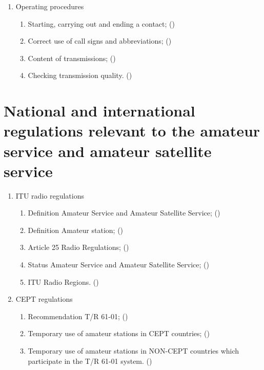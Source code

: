 \begin{flushleft}
\begin{enumerate}
\begin{enumerate}
\item Operating procedures
\begin{enumerate}
\item Starting, carrying out and ending a contact;
  ()\label{HAREC.b.7.2.1}
\item Correct use of call signs and abbreviations;
  ()\label{HAREC.b.7.2.2}
\item Content of transmissions;
  ()\label{HAREC.b.7.2.3}
\item Checking transmission quality.
  ()\label{HAREC.b.7.2.4}
\end{enumerate}
\end{enumerate}

\end{enumerate}

\newpage

\section[Regulations]{National and international regulations relevant to the amateur service and amateur satellite service}

\begin{enumerate}

\item ITU radio regulations
\begin{enumerate}
\item Definition Amateur Service and Amateur Satellite Service;
  ()\label{HAREC.c.1.1}
\item Definition Amateur station;
  ()\label{HAREC.c.1.2}
\item Article 25 Radio Regulations;
  ()\label{HAREC.c.1.3}
\item Status Amateur Service and Amateur Satellite Service;
  ()\label{HAREC.c.1.4}
\item ITU Radio Regions.
  ()\label{HAREC.c.1.5}
\end{enumerate}

\item CEPT regulations
\begin{enumerate}
\item Recommendation T/R 61-01;
  ()\label{HAREC.c.2.1}
\item Temporary use of amateur stations in CEPT countries;
  ()\label{HAREC.c.2.2}
\item Temporary use of amateur stations in NON-CEPT countries which participate
  in the T/R 61-01 system. ()\label{HAREC.c.2.3}
\end{enumerate}


\end{enumerate}
\end{flushleft}
